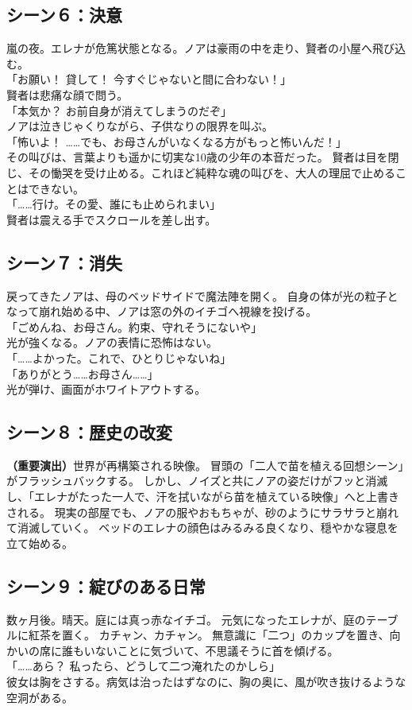 \subsection{シーン６：決意}
嵐の夜。エレナが危篤状態となる。ノアは豪雨の中を走り、賢者の小屋へ飛び込む。
\\「お願い！ 貸して！ 今すぐじゃないと間に合わない！」\\
賢者は悲痛な顔で問う。
\\「本気か？ お前自身が消えてしまうのだぞ」\\
ノアは泣きじゃくりながら、子供なりの限界を叫ぶ。
\\「怖いよ！ ……でも、お母さんがいなくなる方がもっと怖いんだ！」\\
その叫びは、言葉よりも遥かに切実な10歳の少年の本音だった。
賢者は目を閉じ、その慟哭を受け止める。これほど純粋な魂の叫びを、大人の理屈で止めることはできない。
\\「……行け。その愛、誰にも止められまい」\\
賢者は震える手でスクロールを差し出す。

\subsection{シーン７：消失}
戻ってきたノアは、母のベッドサイドで魔法陣を開く。
自身の体が光の粒子となって崩れ始める中、ノアは窓の外のイチゴへ視線を投げる。
\\「ごめんね、お母さん。約束、守れそうにないや」\\
光が強くなる。ノアの表情に恐怖はない。
\\「……よかった。これで、ひとりじゃないね」
\\「ありがとう……お母さん……」\\
光が弾け、画面がホワイトアウトする。

\subsection{シーン８：歴史の改変}
\textbf{（重要演出）}世界が再構築される映像。
冒頭の「二人で苗を植える回想シーン」がフラッシュバックする。
しかし、ノイズと共にノアの姿だけがフッと消滅し、「エレナがたった一人で、汗を拭いながら苗を植えている映像」へと上書きされる。
現実の部屋でも、ノアの服やおもちゃが、砂のようにサラサラと崩れて消滅していく。
ベッドのエレナの顔色はみるみる良くなり、穏やかな寝息を立て始める。

\subsection{シーン９：綻びのある日常}
数ヶ月後。晴天。庭には真っ赤なイチゴ。
元気になったエレナが、庭のテーブルに紅茶を置く。
カチャン、カチャン。
無意識に「二つ」のカップを置き、向かいの席に誰もいないことに気づいて、不思議そうに首を傾げる。
\\「……あら？ 私ったら、どうして二つ淹れたのかしら」\\
彼女は胸をさする。病気は治ったはずなのに、胸の奥に、風が吹き抜けるような空洞がある。

